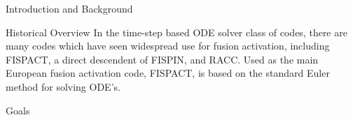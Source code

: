 \begin{chapter}{Introduction and Background}
\begin{section}{Historical Overview}
  In the time-step based ODE solver class of codes, there are many
  codes which have seen widespread use for fusion activation,
  including FISPACT, a direct descendent of FISPIN, and RACC.  Used as
  the main European fusion activation code, FISPACT, is based on the
  standard Euler method for solving ODE's.  
  
  
  
\end{section}

\begin{section}{Goals}
  
\end{section}


\end{chapter}